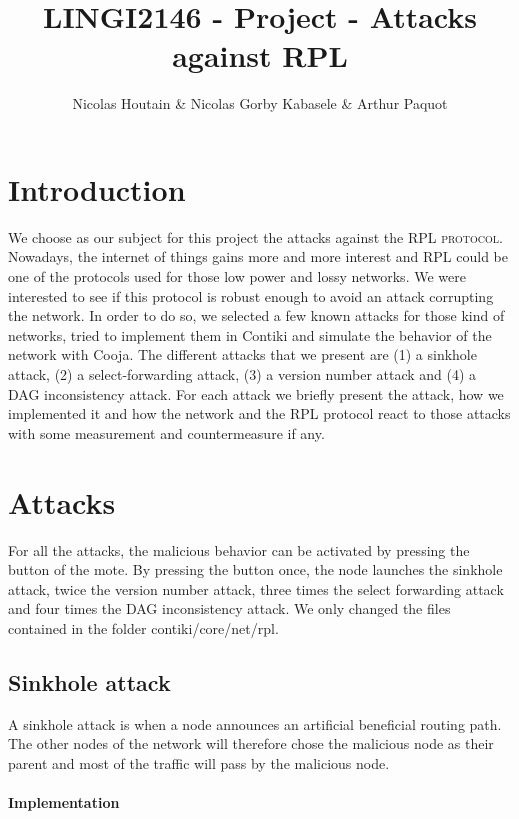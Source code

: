 \documentclass{report}
\title{LINGI2146 - Project - Attacks against RPL}
\author{Nicolas Houtain \& Nicolas Gorby Kabasele \& Arthur Paquot}
\begin{document}
\maketitle
\section{Introduction}

We choose as our subject for this project the attacks against the
\textsc{RPL protocol}. Nowadays, the internet of things gains more and
more interest and \textsc{RPL} could be one of the protocols used for
those low power and lossy networks. 
We were interested to see if this protocol is robust enough to
avoid an attack corrupting the network. In order to do so, we selected a
few known attacks for those kind of networks, tried to implement
them in Contiki and simulate the behavior of the network with Cooja. 
The different attacks that we present are (1) a sinkhole attack, (2) a
select-forwarding attack, (3) a version number attack and (4) a DAG
inconsistency attack. For each attack we briefly present the attack, how
we implemented it and how the network and the \textsc{RPL} protocol react to
those attacks with some measurement and countermeasure if any. 

\section{Attacks}

For all the attacks, the malicious behavior can be activated by pressing
the button of the mote. By pressing the button once, the node launches
the sinkhole attack, twice the version number attack, three times the
select forwarding attack and four times the DAG inconsistency attack. We
only changed the files contained in the folder contiki/core/net/rpl.

\subsection{Sinkhole attack}

A sinkhole attack is when a node announces an artificial beneficial
routing path. The other nodes of the network will therefore chose the
malicious node as their parent and most of the traffic will pass by the
malicious node.

\paragraph{Implementation}
\end{document}
